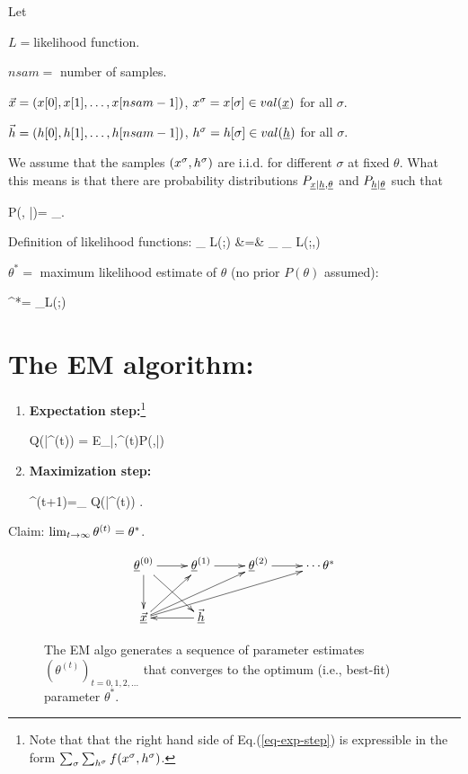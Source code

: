 Let

$ L=$likelihood
function.

$nsam=$ number of samples.

${\vec{x}}=(x[0], x[1], \ldots, x[nsam-1])$,
 $x^\s=x[\s]\in val(\rvx)$ for all $\sigma$.

${\vec{h}}=(h[0], h[1], \ldots, h[nsam-1])$,
$h^\s=h[\s]\in val(\rvh)$ for all $\sigma$.

We assume that the samples $(x^\sigma,h^\sigma)$
are i.i.d. for different $\sigma$ at fixed
$\theta$.
What this means is that
there are
probability distributions
$P_{\rvx|\rvh,\ul{\theta}}$
and $P_{\rvh|\ul{\theta}}$
such that

\beq
P(\vecx, \vech|\theta)=
\prod_\sigma {}
\;.
\eeq

Definition of likelihood functions:
\beqa
{}
_{ L(\theta;\vecx)}
&=&
\sum_{\vech}
_{ L(\theta;\vecx,\vech)}
\eeqa


$\theta^*=$ maximum likelihood
estimate of $\theta$ (no prior $P(\theta)$
assumed):

\beq
\theta^*=
\argmax_\theta L(\theta;\vecx)
\eeq

\section{The EM algorithm:}
\begin{enumerate}
\item{\bf Expectation step:}\footnote{
Note that
that
the right hand side of
Eq.(\ref{eq-exp-step})
is expressible
in the form $\sum_\sigma
\sum_{h^\sigma}f(x^\sigma,
h^\sigma)$.}

\beq
Q(\theta|\theta^{(t)})
=
E_{\vech|\vecx,\theta^{(t)}}\ln P(\vecx,\vech|\theta)
\label{eq-exp-step}
\eeq

\item{\bf Maximization step:}

\beq
\theta^{(t+1)}=\argmax_\theta
Q(\theta|\theta^{(t)})
\label{eq-maxi-step}
\;.
\eeq
\end{enumerate}


Claim: $\lim_{t\rightarrow \infty}
\theta^{(t)}=\theta^*$.

\begin{figure}[h!]
$$\xymatrix{
\ul{\theta}^{(0)}\ar[d]\ar[dr]\ar[r]
&\ul{\theta}^{(1)}\ar[r]
&\ul{\theta}^{(2)}\ar[r]
&\cdots\theta^*
\\
\ul{\vecx}\ar[ru]\ar[rru]\ar[urrr]
&\ul{\vech}\ar[l]
}$$
\caption{
The EM algo generates
a sequence of
parameter estimates
$(\theta^{(t)})_{t=0, 1,2, \ldots}$
that converges to the optimum (i.e.,
best-fit) parameter $\theta^*$.
}
\label{fig-emax-dynamical-bnet}
\end{figure}

